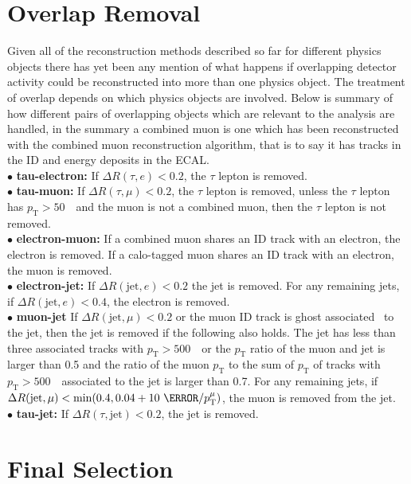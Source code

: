 \section{Overlap Removal}
Given all of the reconstruction methods described so far for different physics
objects there has yet been any mention of what happens if overlapping detector
activity could be reconstructed into more than one physics object. The treatment
of overlap depends on which physics objects are involved. Below is summary of
how different pairs of overlapping objects which are relevant to the analysis
are handled, in the summary a combined muon is one which has been reconstructed
with the combined muon reconstruction algorithm, that is to say it has tracks in
the ID and energy deposits in the ECAL.\\
$\bullet$ \textbf{tau-electron:} If $\Delta R(\tau,e)<0.2$, the $\tau$ lepton is
removed.\\
%
$\bullet$ \textbf{tau-muon:} If $\Delta R(\tau,\mu)<0.2$, the $\tau$ lepton is
removed, unless the $\tau$ lepton has $p_{\mathrm{T}}>50$~\GeV\ and the muon is not a combined
muon, then the $\tau$ lepton is not removed.\\
%
$\bullet$ \textbf{electron-muon:} If a combined muon shares an ID track with an
electron, the electron is removed. If a calo-tagged muon shares an ID track with
an electron, the muon is removed.\\
%
$\bullet$ \textbf{electron-jet:} If $\Delta R(\text{jet},e)<0.2$ the jet is
removed. For any remaining jets, if $\Delta R(\text{jet},e)<0.4$, the
electron is removed.\\
%
$\bullet$ \textbf{muon-jet} If $\Delta R(\text{jet},\mu)<0.2$ or the muon ID
track is ghost associated~\cite{PER-2012-02, Caccciari_2008, CACCIARI2008119} to
the jet, then the jet is removed if the following also holds. The jet has less
than three associated tracks with $p_{\mathrm{T}} > 500$~\MeV\ or the $p_{\mathrm{T}}$ ratio of the muon
and jet is larger than 0.5 and the ratio of the muon $p_{\mathrm{T}}$ to the sum of $p_{\mathrm{T}}$
of tracks with $p_{\mathrm{T}} > 500$~\MeV\ associated to the jet is larger than 0.7. For
any remaining jets, if $\Delta R(\text{jet},\mu)<\min(0.4, 0.04 + 10\ \GeV /
p_{\mathrm{T}}^{\mu})$, the muon is removed from the jet.\\
%
$\bullet$ \textbf{tau-jet:} If $\Delta R(\tau,\text{jet})<0.2$, the jet is
removed.

\section{Final Selection}
\label{sec:selection}

